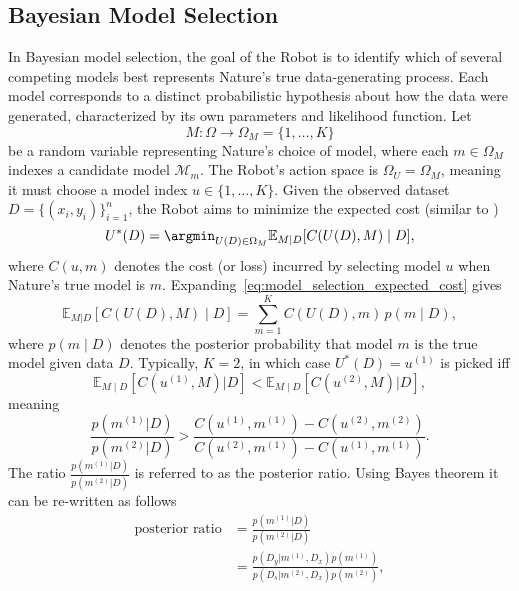 \subsection{Bayesian Model Selection}
\label{sec:model_selection}
In Bayesian model selection, the goal of the Robot is to identify which of several competing models best represents Nature’s true data-generating process. Each model corresponds to a distinct probabilistic hypothesis about how the data were generated, characterized by its own parameters and likelihood function. Let 
\begin{equation}
	M \colon \Omega \to \Omega_M = \{1, \dots, K\}
\end{equation}
be a random variable representing Nature’s choice of model, where each $m \in \Omega_M$ indexes a candidate model $\mathcal{M}_m $. The Robot’s action space is $\Omega_U = \Omega_M$, meaning it must choose a model index $u \in \{1, \dots, K\}$. Given the observed dataset $D = \{(x_i, y_i)\}_{i=1}^n$, the Robot aims to minimize the expected cost (similar to )
\begin{equation}
	U^*(D) = \argmin_{U(D) \in \Omega_M} \mathbb{E}_{M|D}[C(U(D), M) \mid D],
	\label{eq:model_selection_expected_cost}
\end{equation}
where $C(u, m)$ denotes the cost (or loss) incurred by selecting model $u$ when Nature’s true model is $m$. Expanding~\eqref{eq:model_selection_expected_cost} gives
\begin{equation}
	\mathbb{E}_{M|D}[C(U(D), M) \mid D]
	= \sum_{m=1}^{K} C(U(D), m)\, p(m \mid D),
	\label{eq:model_selection_cost_expanded}
\end{equation}
where $p(m \mid D)$ denotes the posterior probability that model $m$ is the true model given data $D$. Typically, $K=2$, in which case $U^*(D) = u^{(1)}$ is picked iff 
\begin{equation} 
	\mathbb{E}_{M\mid D}[C(u^{(1)}, M)|D]<\mathbb{E}_{M\mid D}[C(u^{(2)}, M)|D], 
\end{equation} 
meaning 
\begin{equation} 
	\frac{p(m^{(1)}|D)}{p(m^{(2)}|D)}>\frac{C(u^{(1)},m^{(1)})-C(u^{(2)},m^{(2)})}{C(u^{(2)},m^{(1)})-C(u^{(1)},m^{(1)})}. 
\end{equation} 
The ratio $\frac{p(m^{(1)}|D)}{p(m^{(2)}|D)}$ is referred to as the posterior ratio. Using Bayes theorem it can be re-written as follows 
\begin{equation} 
	\begin{split} 
		\text{posterior ratio} &= \frac{p(m^{(1)}|D)}{p(m^{(2)}|D)}\\ & = \frac{p(D_y|m^{(1)},D_x)p(m^{(1)})}{p(D_s|m^{(2)},D_x)p(m^{(2)})}, 
	\end{split}
\end{equation} 

